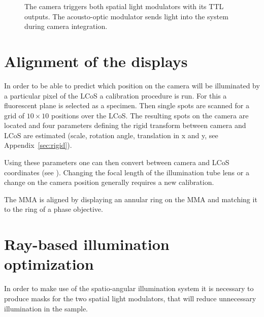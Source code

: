 \begin{figure}[!hbt]
  \centering
  
  \caption{The camera triggers both spatial light modulators with its
    TTL outputs. The acousto-optic modulator sends light into the
    system during camera integration.}
  \label{fig:memi-electronics}
\end{figure}

\section{Alignment of the displays}

In order to be able to predict which position on the camera will be
illuminated by a particular pixel of the LCoS a calibration procedure
is run. For this a fluorescent plane is selected as a specimen. Then
single spots are scanned for a grid of $10\times10$ positions over the
LCoS. The resulting spots on the camera are located and four
parameters defining the rigid transform between camera and LCoS are
estimated (scale, rotation angle, translation in x and y, see
Appendix~\ref{sec:rigid}).

Using these parameters one can then convert between camera and LCoS
coordinates (see ). Changing the focal
length of the illumination tube lens or a change on the camera position
generally requires a new calibration.


The MMA is aligned by displaying an annular ring on the MMA and
matching it to the ring of a phase objective.


\section{Ray-based illumination optimization}
In order to make use of the spatio-angular illumination system it is
necessary to produce masks for the two spatial light modulators, that
will reduce unnecessary illumination in the sample.

